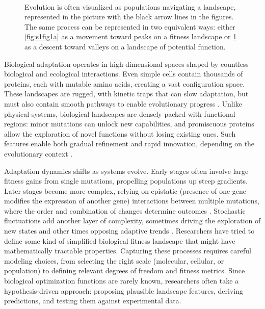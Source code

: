 \documentclass[11pt]{article}
\begin{document}
\begin{figure}[t]
\begin{subfigure}{.5\textwidth}
  \caption{}
  \label{fig:s1fig1b}
\end{subfigure} \\
\caption{Evolution is often visualized as populations navigating a landscape, represented in the picture with the black arrow lines in the figures. The same process can be represented in two equivalent ways: either \ref{fig:s1fig1a} as a movement toward peaks on a fitness landscape or \ref{fig:s1fig1b} as a descent toward valleys on a landscape of potential function. }\label{fig:fig1}
\end{figure} 

Biological adaptation operates in high-dimensional spaces shaped by countless biological and ecological interactions. Even simple cells contain thousands of proteins, each with mutable amino acids, creating a vast configuration space. These landscapes are rugged, with kinetic traps that can slow adaptation, but must also contain smooth pathways to enable evolutionary progress \cite{manrubia2021genotypes, macneil2011gene}. Unlike physical systems, biological landscapes are densely packed with functional regions: minor mutations can unlock new capabilities, and promiscuous proteins allow the exploration of novel functions without losing existing ones. Such features enable both gradual refinement and rapid innovation, depending on the evolutionary context \cite{kuchner1997directed}.

Adaptation dynamics shifts as systems evolve. Early stages often involve large fitness gains from single mutations, propelling populations up steep gradients. Later stages become more complex, relying on epistatic (presence of one gene modifies the expression of another gene) interactions between multiple mutations, where the order and combination of changes determine outcomes \cite{levy2015quantitative}. Stochastic fluctuations add another layer of complexity, sometimes driving the exploration of new states and other times opposing adaptive trends \cite{tan2009emergent}. Researchers have tried to define some kind of simplified biological fitness landscape that might have mathematically tractable properties. Capturing these processes requires careful modeling choices, from selecting the right scale (molecular, cellular, or population) to defining relevant degrees of freedom and fitness metrics. Since biological optimization functions are rarely known, researchers often take a hypothesis-driven approach: proposing plausible landscape features, deriving predictions, and testing them against experimental data.
\end{document}
